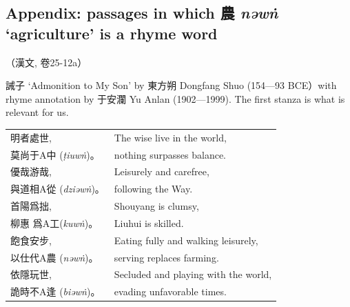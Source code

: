 \subsection*{Appendix: passages in which 農 \textit{nəwṅ} `agriculture' is a rhyme word}



（漢文, 卷25-12a）

誡子 `Admonition to My Son' by 東方朔
Dongfang Shuo (154—93 BCE）with rhyme annotation by 于安瀾 
Yu Anlan (1902—1999). The first stanza is what is relevant for us. 


\begin{longtable}{p{} p{}}

明者處世, & The wise live in the world,\\
莫尚于A中 (\textit{ṭiuwṅ})。%
& nothing surpasses balance.\\

優哉游哉, & Leisurely and carefree,\\
與道相A從 (\textit{dziəwṅ})。%
& following the Way.\\

首陽爲拙, & Shouyang is clumsy,\\
柳惠%
爲A工(\textit{kuwṅ})。 %
& Liuhui is skilled.\\

飽食安步, & Eating fully and walking leisurely,\\
以仕代A農 (\textit{nəwṅ})。%
& serving replaces farming.\\

依隱玩世, & Secluded and playing with the world,\\
詭時不A逢 (\textit{biəwṅ})。%
& evading unfavorable times.\\



\end{longtable}
